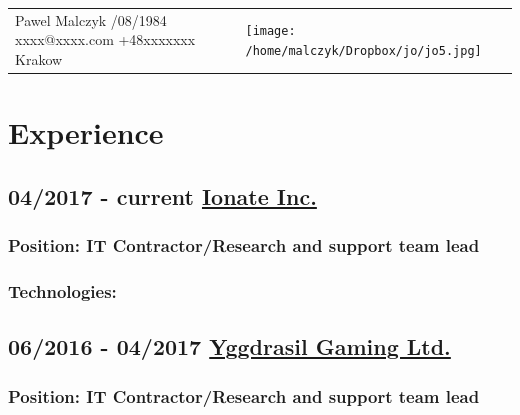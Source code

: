 \documentclass[a4paper]{article}
\begin{document}
\begin{tabular}{  >{\raggedright\arraybackslash}m{10cm}    >{\centering\arraybackslash}m{4cm}  } 
	Pawel Malczyk \newline 21/08/1984 \newline xxxx@xxxx.com \newline +48xxxxxxx \newline Krakow \newline & \texttt{[image: /home/malczyk/Dropbox/jo/jo5.jpg]} 
\end{tabular}

\section*{\LARGE{Experience}\newline} 

\subsection*{04/2017 - current \href{https://ionate.io/}{Ionate Inc.}}

\subsubsection*{Position:  \textcolor[RGB]{140,140,140}{IT Contractor/Research and support team lead}}

\subsubsection*{Technologies:}

\subsection*{06/2016 - 04/2017 \href{http://yggdrasilgaming.com/}{Yggdrasil Gaming Ltd.}}

\subsubsection*{Position:  \textcolor[RGB]{140,140,140}{IT Contractor/Research and support team lead}}
\end{document}
